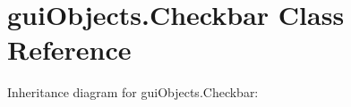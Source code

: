 \hypertarget{classguiObjects_1_1Checkbar}{}\section{gui\+Objects.\+Checkbar Class Reference}
\label{classguiObjects_1_1Checkbar}


Inheritance diagram for gui\+Objects.\+Checkbar\+:
